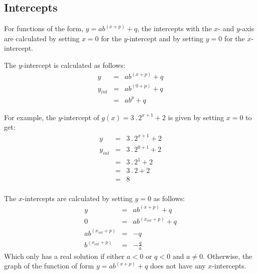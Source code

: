 
\subsection{Intercepts}
For functions of the form, $y=ab^{(x+p)} + q$, the intercepts with the $x$- and $y$-axis are calculated by setting $x=0$ for the $y$-intercept and by setting $y=0$ for the $x$-intercept.

The $y$-intercept is calculated as follows:
\begin{eqnarray}
y&=&ab^{(x+p)} + q\\
y_{int}&=&ab^{(0+p)} + q\\
&=&ab^p + q
\end{eqnarray}

For example, the $y$-intercept of $g(x)=3\,.\, 2^{x+1} + 2$ is given by setting $x=0$ to get:
\begin{eqnarray*}
y&=&3\,.\, 2^{x+1} + 2\\
y_{int}&=&3\,.\, 2^{0+1} + 2\\
&=&3\,.\, 2^{1} + 2\\
&=&3 \,.\, 2 + 2\\
&=&8\\
\end{eqnarray*}

The $x$-intercepts are calculated by setting $y=0$ as follows:
\begin{eqnarray}
y&=&ab^{(x+p)} + q\\
0&=&ab^{(x_{int}+p)} + q\\
ab^{(x_{int}+p)}&=&-q\\
b^{(x_{int}+p)}&=&-\frac{q}{a}
\end{eqnarray}
Which only has a real solution if either $a<0$ or $q<0$ and $a\neq0$. Otherwise, the graph of the function of form $y=ab^{(x+p)} + q$ does not have any $x$-intercepts.

